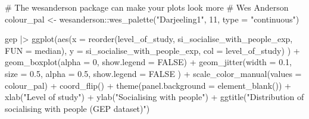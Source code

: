 \documentclass[
  letterpaper,
]{krantz}
\makeatletter
\newenvironment{Shaded}{\begin{snugshade}}{\end{snugshade}}
\newcommand{\AttributeTok}[1]{\textcolor[rgb]{0.40,0.45,0.13}{#1}}
\newcommand{\CommentTok}[1]{\textcolor[rgb]{0.37,0.37,0.37}{#1}}
\newcommand{\ConstantTok}[1]{\textcolor[rgb]{0.56,0.35,0.01}{#1}}
\newcommand{\DecValTok}[1]{\textcolor[rgb]{0.68,0.00,0.00}{#1}}
\newcommand{\FloatTok}[1]{\textcolor[rgb]{0.68,0.00,0.00}{#1}}
\newcommand{\FunctionTok}[1]{\textcolor[rgb]{0.28,0.35,0.67}{#1}}
\newcommand{\NormalTok}[1]{\textcolor[rgb]{0.00,0.23,0.31}{#1}}
\newcommand{\OtherTok}[1]{\textcolor[rgb]{0.00,0.23,0.31}{#1}}
\newcommand{\SpecialCharTok}[1]{\textcolor[rgb]{0.37,0.37,0.37}{#1}}
\newcommand{\StringTok}[1]{\textcolor[rgb]{0.13,0.47,0.30}{#1}}
\newenvironment{kframe}{%
\medskip{}
\setlength{\fboxsep}{.8em}
 \def\at@end@of@kframe{}%
 \ifinner\ifhmode%
  \def\at@end@of@kframe{\end{minipage}}%
  \begin{minipage}{\columnwidth}%
 \fi\fi%
 \def\FrameCommand##1{\hskip\@totalleftmargin \hskip-\fboxsep
 \colorbox{shadecolor}{##1}\hskip-\fboxsep
     \hskip-\linewidth \hskip-\@totalleftmargin \hskip\columnwidth}%
 \MakeFramed {\advance\hsize-\width
   \@totalleftmargin\z@ \linewidth\hsize
   \@setminipage}}%
 {\par\unskip\endMakeFramed%
 \at@end@of@kframe}
\renewenvironment{Shaded}{\begin{kframe}}{\end{kframe}}
\makeatother
\begin{document}
\begin{Shaded}
\begin{Highlighting}[]
\CommentTok{\# The wesanderson package can make your plots look more}
\CommentTok{\# \textquotesingle{}Wes Anderson\textquotesingle{}}
\NormalTok{colour\_pal }\OtherTok{\textless{}{-}}
\NormalTok{  wesanderson}\SpecialCharTok{::}\FunctionTok{wes\_palette}\NormalTok{(}\StringTok{"Darjeeling1"}\NormalTok{,}
                           \DecValTok{11}\NormalTok{,}
                           \AttributeTok{type =} \StringTok{"continuous"}\NormalTok{)}

\NormalTok{gep }\SpecialCharTok{|\textgreater{}}
  \FunctionTok{ggplot}\NormalTok{(}\FunctionTok{aes}\NormalTok{(}\AttributeTok{x =} \FunctionTok{reorder}\NormalTok{(level\_of\_study,}
\NormalTok{                         si\_socialise\_with\_people\_exp,}
                         \AttributeTok{FUN =}\NormalTok{ median),}
             \AttributeTok{y =}\NormalTok{ si\_socialise\_with\_people\_exp,}
             \AttributeTok{col =}\NormalTok{ level\_of\_study)}
\NormalTok{         ) }\SpecialCharTok{+}
  \FunctionTok{geom\_boxplot}\NormalTok{(}\AttributeTok{alpha =} \DecValTok{0}\NormalTok{,}
               \AttributeTok{show.legend =} \ConstantTok{FALSE}\NormalTok{) }\SpecialCharTok{+}
  \FunctionTok{geom\_jitter}\NormalTok{(}\AttributeTok{width =} \FloatTok{0.1}\NormalTok{,}
              \AttributeTok{size =} \FloatTok{0.5}\NormalTok{,}
              \AttributeTok{alpha =} \FloatTok{0.5}\NormalTok{,}
              \AttributeTok{show.legend =} \ConstantTok{FALSE}
\NormalTok{              ) }\SpecialCharTok{+}
  \FunctionTok{scale\_color\_manual}\NormalTok{(}\AttributeTok{values =}\NormalTok{ colour\_pal) }\SpecialCharTok{+}
  \FunctionTok{coord\_flip}\NormalTok{() }\SpecialCharTok{+}
  \FunctionTok{theme}\NormalTok{(}\AttributeTok{panel.background =} \FunctionTok{element\_blank}\NormalTok{()) }\SpecialCharTok{+}
  \FunctionTok{xlab}\NormalTok{(}\StringTok{"Level of study"}\NormalTok{) }\SpecialCharTok{+}
  \FunctionTok{ylab}\NormalTok{(}\StringTok{"Socialising with people"}\NormalTok{) }\SpecialCharTok{+}
  \FunctionTok{ggtitle}\NormalTok{(}\StringTok{"Distribution of \textquotesingle{}socialising with people\textquotesingle{} (GEP dataset)"}\NormalTok{)}
\end{Highlighting}
\end{Shaded}
\end{document}
